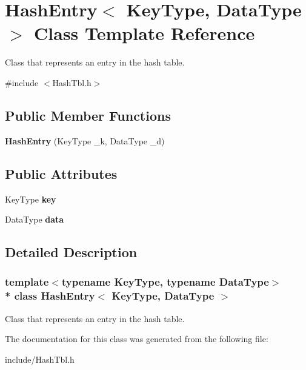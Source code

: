\hypertarget{classHashEntry}{}\section{Hash\+Entry$<$ Key\+Type, Data\+Type $>$ Class Template Reference}
\label{classHashEntry}


Class that represents an entry in the hash table.  




{\ttfamily \#include $<$Hash\+Tbl.\+h$>$}

\subsection*{Public Member Functions}
\begin{DoxyCompactItemize}
\item 
{\bfseries Hash\+Entry} (Key\+Type \+\_\+k, Data\+Type \+\_\+d)\hypertarget{classHashEntry_ac934162b89af3258120ee3eea7409a4e}{}\label{classHashEntry_ac934162b89af3258120ee3eea7409a4e}

\end{DoxyCompactItemize}
\subsection*{Public Attributes}
\begin{DoxyCompactItemize}
\item 
Key\+Type {\bfseries key}\hypertarget{classHashEntry_ab1e2cceabe35d94165a0fe7284b8e65a}{}\label{classHashEntry_ab1e2cceabe35d94165a0fe7284b8e65a}

\item 
Data\+Type {\bfseries data}\hypertarget{classHashEntry_ac04c709c3188e3230b8e7287e986ff22}{}\label{classHashEntry_ac04c709c3188e3230b8e7287e986ff22}

\end{DoxyCompactItemize}


\subsection{Detailed Description}
\subsubsection*{template$<$typename Key\+Type, typename Data\+Type$>$\\*
class Hash\+Entry$<$ Key\+Type, Data\+Type $>$}

Class that represents an entry in the hash table. 

The documentation for this class was generated from the following file\+:\begin{DoxyCompactItemize}
\item 
include/Hash\+Tbl.\+h\end{DoxyCompactItemize}

